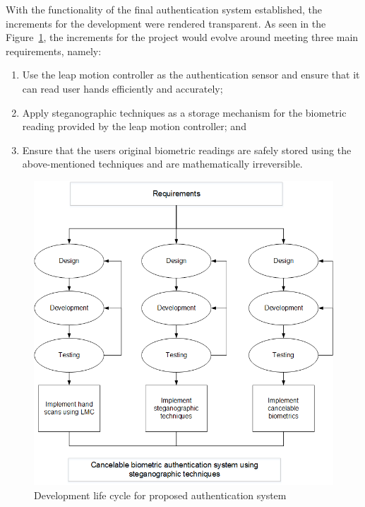 With the functionality of the final authentication system established, the increments for the development were rendered transparent. As seen in the Figure~\ref{fig:Development life cycle for proposed authentication system}, the increments for the project would evolve around meeting three main requirements, namely:

    \begin{enumerate}[label=\roman*.]
        \item Use the leap motion controller as the authentication sensor and ensure that it can read user hands efficiently and accurately;
        \item Apply steganographic techniques as a storage mechanism for the biometric reading provided by the leap motion controller; and
        \item Ensure that the users original biometric readings are safely stored using the above-mentioned techniques and are mathematically irreversible.
    \end{enumerate}
    
    
    \begin{figure}[htbp!] 
    \centering    
    \includegraphics[width=1.0\textwidth]{Chapter3/Figs/Figure3-3.png}
    \caption[Development life cycle for proposed authentication system]{Development life cycle for proposed authentication system}
    \label{fig:Development life cycle for proposed authentication system}
    \end{figure}
    
